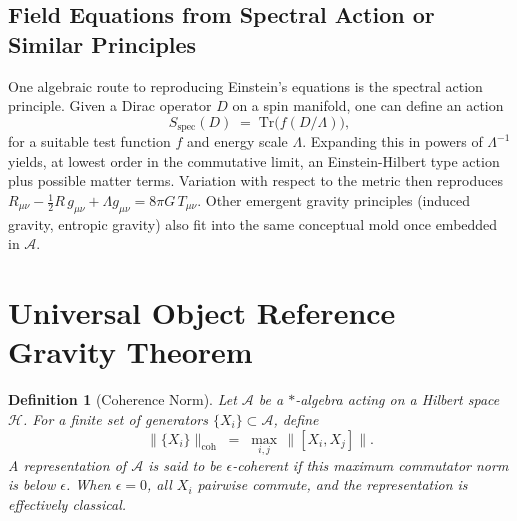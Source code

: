 \documentclass[11pt]{article}
\newtheorem{definition}[theorem]{Definition}
\begin{document}
\subsection{Field Equations from Spectral Action or Similar Principles}
One algebraic route to reproducing Einstein's equations is the spectral action principle. Given a Dirac operator $D$ on a spin manifold, one can define an action
\[
S_{\mathrm{spec}}(D) \;=\; \mathrm{Tr}\bigl(f(D/\Lambda)\bigr),
\]
for a suitable test function $f$ and energy scale $\Lambda$. Expanding this in powers of $\Lambda^{-1}$ yields, at lowest order in the commutative limit, an Einstein-Hilbert type action plus possible matter terms. Variation with respect to the metric then reproduces $R_{\mu\nu}- \tfrac{1}{2}R\,g_{\mu\nu} + \Lambda g_{\mu\nu} = 8\pi G\, T_{\mu\nu}$. Other emergent gravity principles (induced gravity, entropic gravity) also fit into the same conceptual mold once embedded in $\mathcal{A}$.

\section{Universal Object Reference Gravity Theorem}
\label{sec:theorem-statement}

\begin{definition}[Coherence Norm]
Let $\mathcal{A}$ be a $*$-algebra acting on a Hilbert space $\mathcal{H}$. For a finite set of generators $\{X_i\}\subset \mathcal{A}$, define
\[
\| \{X_i\} \|_{\mathrm{coh}} \;=\; \max_{i,j}\,\bigl\|[X_i, X_j]\bigr\|.
\]
A representation of $\mathcal{A}$ is said to be \emph{$\epsilon$-coherent} if this maximum commutator norm is below $\epsilon$. When $\epsilon = 0$, all $X_i$ pairwise commute, and the representation is effectively classical.
\end{definition}
\end{document}
